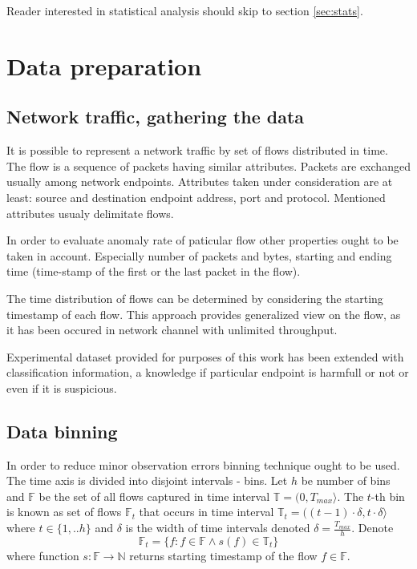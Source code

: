\documentclass[a4paper,journal]{IEEEtran}
\begin{document}
Reader interested in statistical analysis should skip to section \ref{sec:stats}. 

\section{Data preparation}\label{sec:prep}
\subsection{Network traffic, gathering the data}
It is possible to represent a network traffic by set of flows distributed in time. The flow is a sequence of packets having  similar attributes. Packets are exchanged usually among network endpoints. Attributes taken under consideration are at least: source and destination endpoint address, port and protocol. Mentioned attributes usualy delimitate flows.

In order to evaluate anomaly rate of paticular flow other properties ought to be taken in account. Especially number of packets and bytes, starting and ending time (time-stamp of the first or the last packet in the flow).

The time distribution of flows can be determined by considering the starting timestamp of each flow. This approach provides generalized view on the flow, as it has been occured in network channel with unlimited throughput.

Experimental dataset provided for purposes of this work has been extended with classification information, a knowledge if particular endpoint is harmfull or not or even if it is suspicious.

\subsection{Data binning}
In order to reduce minor observation errors binning technique ought to be used. The time axis is divided into disjoint intervals - bins. Let $h$ be number of bins and $\mathbb{F}$ be the set of all flows captured in time interval $\mathbb{T} = (0, T_{max}\rangle $. The $t$-th bin is known as  set of flows $\mathbb{F}_t$ that occurs in time interval $\mathbb{T}_t = ((t-1)\cdot \delta, t\cdot \delta\rangle $ where $t \in \{1, .. h\}$ and $\delta$ is the width of time intervals denoted $\delta = \frac{T_{max}}{h}$. Denote
\begin{equation}
\mathbb{F}_t = \{f : f \in \mathbb{F} \wedge s(f) \in \mathbb{T}_t \}
\end{equation}
where function $s:\mathbb{F} \rightarrow \mathbb{N} $ 
returns starting timestamp of the flow $f\in \mathbb{F}$.
\end{document}
